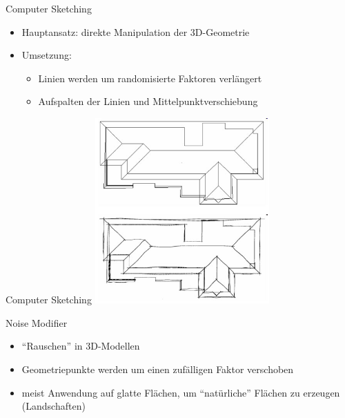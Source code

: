 \begin{frame}{Computer Sketching}
  \begin{itemize}
    \item Hauptansatz: direkte Manipulation der 3D-Geometrie
    \item Umsetzung:
    \begin{itemize}
      \item Linien werden um randomisierte Faktoren verlängert
      \item Aufspalten der Linien und Mittelpunktverschiebung
    \end{itemize}
  \end{itemize}
\end{frame}

\begin{frame}{Computer Sketching}
  \includegraphics[width=0.5\textwidth]{../images/haus.jpg}
\end{frame}

\begin{frame}{Noise Modifier}
  \begin{itemize}
    \item "`Rauschen"' in 3D-Modellen
    \item Geometriepunkte werden um einen zufälligen Faktor
    verschoben
    \item meist Anwendung auf glatte Flächen, um
    "`natürliche"' Flächen zu erzeugen (Landschaften)
  \end{itemize}
\end{frame}

